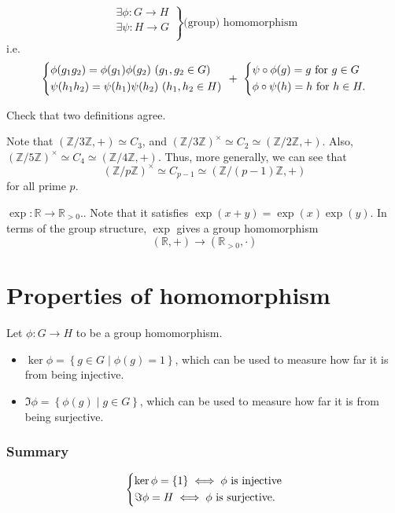 \begin{definition}
\[
    \left.
    \begin{array}{c}
         \exists \phi : G \to  H \\
          \exists \psi : H \to  G\\
    \end{array}
    \right\} \text{(group) homomorphism}
\]
i.e. 
\[
    \begin{dcases}
        \phi (g_1 g_2) = \phi (g_1) \phi (g_2) \ (g_1, g_2 \in G) \\
        \psi (h_1 h_2) = \psi (h_1) \psi (h_2) \ (h_1, h_2 \in H)
    \end{dcases} \ + \ \begin{dcases}
        \psi \circ \phi (g) = g \text{ for } g \in G \\
        \phi \circ \psi (h) = h \text{ for } h \in H.
    \end{dcases}
\]
\end{definition}

\begin{exercise}
    Check that two definitions agree.
\end{exercise}

Note that \((\mathbb{Z} / 3 \mathbb{Z}, +) \simeq C_3\), and \((\mathbb{Z} / 3 \mathbb{Z} )^{\times } \simeq C_2 \simeq (\mathbb{Z} / 2 \mathbb{Z} , +)\).  Also, \((\mathbb{Z} / 5 \mathbb{Z} )^{\times } \simeq C_4 \simeq (\mathbb{Z} / 4 \mathbb{Z} , +)\). Thus, more generally, we can see that 
\[
    (\mathbb{Z} / p \mathbb{Z} )^{\times } \simeq C_{p-1} \simeq (\mathbb{Z}  / (p-1) \mathbb{Z} , +)
\] for all prime \(p\). 

\begin{eg}
\(\exp : \mathbb{R} \to \mathbb{R} _{>0}.\). Note that it satisfies \(\exp (x+y)=\exp (x)\exp (y)\). In terms of the group structure, \(\exp \) gives a group homomorphism
\[
    (\mathbb{R} , +) \to (\mathbb{R} _{>0}, \cdot)
\]   
\end{eg}

\section{Properties of homomorphism}
\begin{definition}
    Let \(\phi : G \to H\) to be a group homomorphism. 
    \begin{itemize}
        \item \(\ker \phi = \left\{ g \in G \mid \phi (g) = 1 \right\} \), which can be used to measure how far it is from being injective. 
        \item \(\Im \phi = \left\{\phi (g) \mid g \in G  \right\} \), which can be used to measure how far it is from being surjective. 
    \end{itemize} 
\end{definition}

\subsubsection{Summary}
\[
    \begin{dcases}
        \ker \phi = \left\{ 1 \right\} \iff \phi \text{ is injective} \\
        \Im \phi = H \iff \phi \text{ is surjective}. 
    \end{dcases}
\]